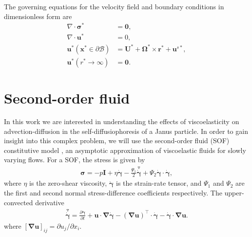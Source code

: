 \documentclass[aps,pre,reprint,twocolumn,notitlepage,superscriptaddress]{revtex4-1}
\begin{document}
The governing equations for the velocity field and boundary conditions in dimensionless form are
\begin{align}
\nabla \cdot\boldsymbol{\sigma}^{*}&=\boldsymbol{0},\label{veload}\\
\nabla \cdot \boldsymbol{u}^{*} &= 0,\label{continuityad}\\
\boldsymbol{u}^{*}(\boldsymbol{x^*} \in \partial \mathcal{B}) &= \boldsymbol{U}^{*}+\boldsymbol{\Omega}^{*}\times\boldsymbol{r}^{*}+\boldsymbol{u}^{s*}\label{ubad},\\
\boldsymbol{u}^{*}(r^{*}\longrightarrow \infty)&=\boldsymbol{0}.\label{ucad}
\end{align}


\section{Second-order fluid}
In this work we are interested in understanding the effects of viscoelasticity on advection-diffusion in the self-diffusiophoresis of a Janus particle. In order to gain insight into this complex problem, we will use the second-order fluid (SOF) constitutive model \citep{bird1977dynamics}, an asymptotic approximation of viscoelastic fluids for slowly varying flows. For a SOF, the stress is given by
\begin{align}\label{SO}
\boldsymbol{\sigma}=-p\boldsymbol{I}+\eta\dot{\boldsymbol{\gamma}}-\frac{\Psi_1}{2}\overset{\triangledown}{\dot{\boldsymbol{\gamma}}}+\Psi_2\dot{\boldsymbol{\gamma}}\cdot\dot{\boldsymbol{\gamma}},
\end{align}
where $\eta$ is the zero-shear viscosity, $\dot{\boldsymbol{\gamma}}$ is the strain-rate tensor, and $\Psi_{1}$ and $\Psi_{2}$ are the first and second normal stress-difference coefficients respectively. The upper-convected derivative
\begin{align}
\overset{\triangledown}{\dot{\boldsymbol{\gamma}}}=\frac{\partial\dot{\boldsymbol{\gamma}}}{\partial t}+\boldsymbol{u}\cdot\boldsymbol{\nabla}\dot{\boldsymbol{\gamma}}-(\boldsymbol{\nabla}\boldsymbol{u})^\top\cdot\dot{\boldsymbol{\gamma}}-\dot{\boldsymbol{\gamma}}\cdot\boldsymbol{\nabla}\boldsymbol{u}.
\end{align}
where $[\boldsymbol{\nabla}\boldsymbol{u}]_{ij}=\partial u_j/\partial x_i$.
\end{document}

